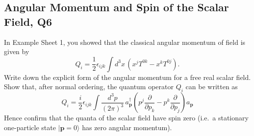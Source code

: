 \subsection{Angular Momentum and Spin of the Scalar Field, Q6}

In Example Sheet 1, you showed that the classical angular momentum of field is given by
\begin{equation}
    Q_i = \frac{1}{2}\epsilon_{ijk}\int d^3x\,(x^j T^{0k} - x^k T^{0j}).
\end{equation}
Write down the explicit form of the angular momentum for a free real scalar field. Show that, after normal ordering, the quantum operator $Q_i$ can be written as
\begin{equation}
    Q_i = \frac{i}{2}\epsilon_{ijk}\int\frac{d^3p}{(2\pi)^3}\,a_{\mathbf{p}}^\dagger\left(p^j\frac{\partial}{\partial p_k} - p^k\frac{\partial}{\partial p_j}\right)a_{\mathbf{p}}
\end{equation}
Hence confirm that the quanta of the scalar field have spin zero (i.e.\ a stationary one-particle state $|\mathbf{p}=0\rangle$ has zero angular momentum).

